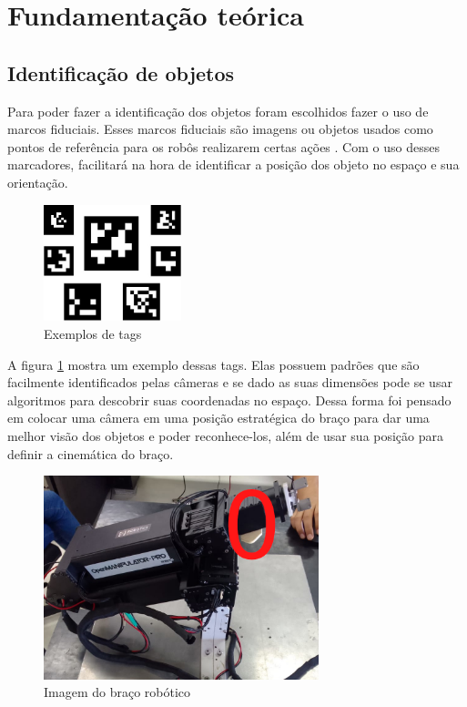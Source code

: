 \documentclass[conference]{IEEEtran}
\begin{document}
\section{Fundamentação teórica}

\subsection{Identificação de objetos}

Para poder fazer a identificação dos objetos foram escolhidos fazer o uso de marcos fiduciais. Esses marcos fiduciais são imagens ou objetos usados como pontos de referência para os robôs realizarem certas ações \cite{Fiducial26:online}. %
Com o uso desses marcadores, facilitará na hora de identificar a posição dos objeto no espaço e sua orientação.


\begin{figure}[h!]
\centering
    \includegraphics[width=4cm]{images/markers.jpg}
\caption{Exemplos de tags \cite{OpenCVDe76:online}}
\label{fig:tags}
\end{figure}

A figura \ref{fig:tags} mostra um exemplo dessas tags. Elas possuem padrões que são facilmente identificados pelas câmeras e se dado as suas dimensões pode se usar algoritmos para descobrir suas coordenadas no espaço. Dessa forma foi pensado em colocar uma câmera em uma posição estratégica do braço para dar uma melhor visão dos objetos e poder reconhece-los, além de usar sua posição para definir a cinemática do braço.

\begin{figure}[h!]
    \centering
        \includegraphics[width=8cm]{images/arm_marked.jpeg}
    \caption{Imagem do braço robótico}
    \label{fig:cam_arm}
\end{figure}
\end{document}
